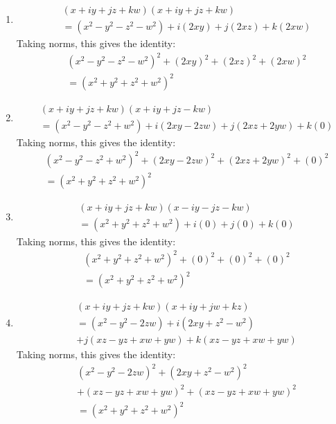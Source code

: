 \documentclass[12pt]{article}
\numberwithin{equation}{section}
\begin{document}
\begin{landscape}
{{\begin{enumerate}[{Identity} I:]
\item
    \begin{align*}
    &(x + iy + jz + kw)(x + iy + jz + kw) \\
    &= (x^2 - y^2 - z^2 - w^2 ) + i(2xy) + j(2xz) + k(2xw) 
    \end{align*}
Taking norms, this gives the identity:
    \begin{align*}
    &(x^2 - y^2 - z^2 - w^2 )^2 + (2xy)^2 + (2xz)^2 + (2xw)^2 \\
    &= (x^2 + y^2 + z^2 + w^2)^2
    \end{align*}
\item
    \begin{align*}
    &(x + iy + jz + kw)(x + iy + jz - kw) \\
    &= (x^2 - y^2 - z^2 + w^2 ) + i(2xy - 2zw) + j(2xz + 2yw) + k(0) 
    \end{align*}
Taking norms, this gives the identity:
    \begin{align*}
    &(x^2 - y^2 - z^2 + w^2 )^2 + (2xy - 2zw)^2 + (2xz + 2yw)^2 + (0)^2\\ 
    &= (x^2 + y^2 + z^2 + w^2)^2
    \end{align*}
\item
    \begin{align*}
    &(x + iy + jz + kw)(x - iy - jz - kw) \\
    &= (x^2 + y^2 + z^2 + w^2 ) + i(0) + j(0) + k(0) 
    \end{align*}
Taking norms, this gives the identity:
    \begin{align*}
    &(x^2 + y^2 + z^2 + w^2 )^2 + (0)^2 + (0)^2 + (0)^2 \\
    &= (x^2 + y^2 + z^2 + w^2)^2
    \end{align*}
\item
    \begin{align*}
    &(x + iy + jz + kw)(x + iy + jw + kz) \\
    &= (x^2 - y^2 - 2zw ) + i(2xy + z^2 -w^2) \\
        &+ j(xz - yz + xw + yw) + k(xz - yz + xw + yw) 
    \end{align*}
Taking norms, this gives the identity:
    \begin{align*}
    &(x^2 - y^2 - 2zw )^2 + (2xy + z^2 - w^2)^2 \\
        &+ (xz - yz + xw + yw)^2 + (xz - yz + xw + yw)^2 \\
    &= (x^2 + y^2 + z^2 + w^2)^2
    \end{align*}

\end{enumerate}}}
\end{landscape}
\end{document}
